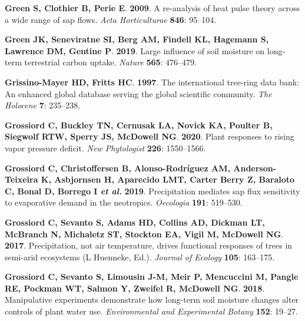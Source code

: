 \documentclass[11pt,twoside]{reedthesis}
\begin{document}
\hypertarget{ref-Green2009}{}
\textbf{\textnormal{Green S}, \textnormal{Clothier B}, \textnormal{Perie
E}}. \textbf{2009}. A re-analysis of heat pulse theory across a wide
range of sap flows. \emph{Acta Horticulturae} \textbf{846}: 95--104.

\hypertarget{ref-green_large_2019}{}
\textbf{\textnormal{Green JK}, \textnormal{Seneviratne SI},
\textnormal{Berg AM}, \textnormal{Findell KL}, \textnormal{Hagemann S},
\textnormal{Lawrence DM}, \textnormal{Gentine P}}. \textbf{2019}. Large
influence of soil moisture on long-term terrestrial carbon uptake.
\emph{Nature} \textbf{565}: 476--479.

\hypertarget{ref-Henri1997}{}
\textbf{\textnormal{Grissino-Mayer HD}, \textnormal{Fritts HC}}.
\textbf{1997}. The international tree-ring data bank: An enhanced global
database serving the global scientific community. \emph{The Holocene}
\textbf{7}: 235--238.

\hypertarget{ref-grossiord_plant_2020}{}
\textbf{\textnormal{Grossiord C}, \textnormal{Buckley TN},
\textnormal{Cernusak LA}, \textnormal{Novick KA}, \textnormal{Poulter
B}, \textnormal{Siegwolf RTW}, \textnormal{Sperry JS},
\textnormal{McDowell NG}}. \textbf{2020}. Plant responses to rising
vapor pressure deficit. \emph{New Phytologist} \textbf{226}: 1550--1566.

\hypertarget{ref-grossiord2019}{}
\textbf{\textnormal{Grossiord C}, \textnormal{Christoffersen B},
\textnormal{Alonso-Rodríguez AM}, \textnormal{Anderson-Teixeira K},
\textnormal{Asbjornsen H}, \textnormal{Aparecido LMT},
\textnormal{Carter Berry Z}, \textnormal{Baraloto C}, \textnormal{Bonal
D}, \textnormal{Borrego I} \emph{et al.}} \textbf{2019}. Precipitation
mediates sap flux sensitivity to evaporative demand in the neotropics.
\emph{Oecologia} \textbf{191}: 519--530.

\hypertarget{ref-grossiord_precipitation_2017}{}
\textbf{\textnormal{Grossiord C}, \textnormal{Sevanto S},
\textnormal{Adams HD}, \textnormal{Collins AD}, \textnormal{Dickman LT},
\textnormal{McBranch N}, \textnormal{Michaletz ST}, \textnormal{Stockton
EA}, \textnormal{Vigil M}, \textnormal{McDowell NG}}. \textbf{2017}.
Precipitation, not air temperature, drives functional responses of trees
in semi-arid ecosystems (L Huenneke, Ed.). \emph{Journal of Ecology}
\textbf{105}: 163--175.

\hypertarget{ref-Grossiord2018}{}
\textbf{\textnormal{Grossiord C}, \textnormal{Sevanto S},
\textnormal{Limousin J-M}, \textnormal{Meir P}, \textnormal{Mencuccini
M}, \textnormal{Pangle RE}, \textnormal{Pockman WT}, \textnormal{Salmon
Y}, \textnormal{Zweifel R}, \textnormal{McDowell NG}}. \textbf{2018}.
Manipulative experiments demonstrate how long-term soil moisture changes
alter controls of plant water use. \emph{Environmental and Experimental
Botany} \textbf{152}: 19--27.
\end{document}

